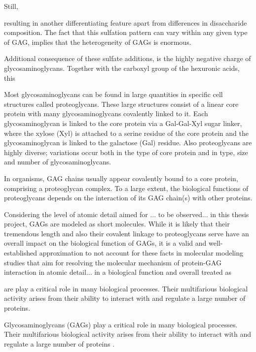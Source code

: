 Still,


 resulting in another differentiating feature apart from differences in disaccharide composition. The fact that this sulfation pattern can vary within any given type of GAG, implies that the heterogeneity of GAGs is enormous.



Additional consequence of these sulfate additions, is the highly negative charge of glycosaminoglycans. Together with the carboxyl group of the hexuronic acids, this


Most glycosaminoglycans can be found in large quantities in specific cell structures called proteoglycans. These large structures consist of a linear core protein with many glycosaminoglycans covalently linked to it. Each glycosaminoglycan is linked to the core protein via a Gal-Gal-Xyl sugar linker, where the xylose (Xyl) is attached to a serine residue of the core protein and the glycosaminoglycan is linked to the galactose (Gal) residue. Also proteoglycans are highly diverse; variations occur both in the type of core protein and in type, size and number of glycosaminoglycans.



In organisms, GAG chains usually
appear covalently bound to a core protein, comprising a proteoglycan complex.
To a large extent, the biological functions of proteoglycans depends on the
interaction of its GAG chain(s) with other proteins.



Considering the level of atomic detail aimed for ... to be observed... in this
thesis project, GAGs are modeled as short molecules. While it is likely
that their tremendous length and also their covalent linkage to proteoglycans
serve have an overall impact on the biological function of GAGs, it is a
valid and well-established approximation to not account for these facts in
molecular modeling studies that aim for resolving the molecular mechanism of
protein-GAG interaction in atomic detail... in a biological function and overall  treated as


are play a critical role in many biological processes.
Their multifarious biological activity arises from their ability to interact
with and regulate a large number of proteins.


Glycosaminoglycans (GAGs) play a critical role in many biological processes.
Their multifarious biological activity arises from their ability to interact
with and regulate a large number of proteins \cite{handel_2005}.

